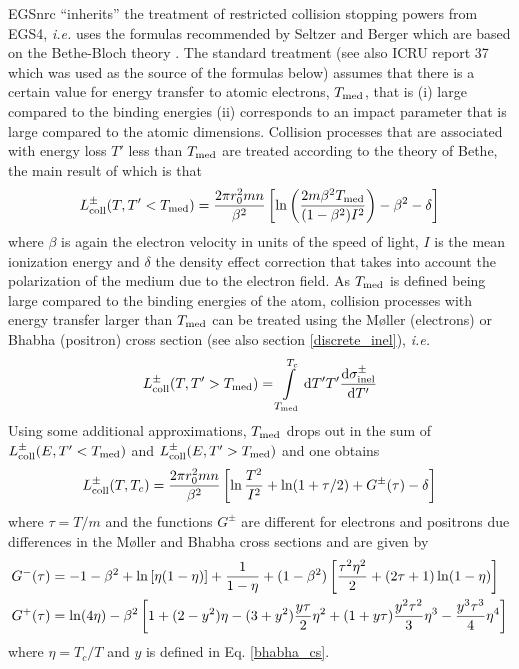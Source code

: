 EGSnrc ``inherits'' the treatment of restricted collision
stopping powers from EGS4, {\em i.e.} uses the formulas
recommended by Seltzer and Berger \cite{BS64} which are based
on the Bethe-Bloch theory \cite{Be30,Be32,Bl33}. The standard
treatment (see also ICRU report 37 \cite{ICRU37} which was
used as the source of the formulas below)
assumes that there is a certain value for energy
transfer to atomic electrons, $T_{\rm med}$, that is (i)
large compared to the binding energies (ii) corresponds to
an impact parameter that is large compared to the atomic
dimensions. Collision processes that are associated with
energy loss $T'$ less than $T_{\rm med}$ are treated according to
the theory of Bethe, the main result of which is that
\begin{equation}
L_{\rm coll}^\pm(T,T' < T_{\rm med}) = {2 \pi r_0^2 m n \over \beta^2}
\left[ \ln \left(2 m \beta^2 T_{\rm med} \over (1 - \beta^2) I^2 \right)
- \beta^2 - \delta \right]
\end{equation}
where $\beta$ is again the electron velocity in units of
the speed of light, $I$ is the mean ionization energy and
$\delta$ the density effect correction that takes into
account the polarization of the medium due to the electron field.
As $T_{\rm med}$ is defined being large compared to the binding energies of
the atom, collision processes with energy transfer larger
than $T_{\rm med}$ can be treated using the M{\o}ller \cite{Mo32a} (electrons)
or Bhabha \cite{Bh35} (positron) cross section (see also section
\ref{discrete_inel}), {\em i.e.}
 
\begin{equation}
L_{\rm coll}^\pm(T,T' > T_{\rm med}) = \int\limits_{T_{\rm med}}^{T_c}
{\rm d}T' T' {{\rm d} \sigma_{\rm inel}^\pm \over {\rm d}T'}
\end{equation}
Using some additional approximations, $T_{\rm med}$ drops out
in the sum of $L_{\rm coll}^\pm(E,T' < T_{\rm med})$ and
$L_{\rm coll}^\pm(E,T' > T_{\rm med})$ and one obtains
\begin{equation}
L_{\rm coll}^\pm(T,T_c) = {2 \pi r_0^2 m n \over \beta^2}
\left[ \ln {T^2 \over I^2} + \ln(1 + \tau/2) + G^\pm(\tau) - \delta \right]
\end{equation}
where $\tau = T/m$ and the functions $G^\pm$ are different for
electrons and positrons due differences in the M{\o}ller and
Bhabha cross sections and are given by
\begin{equation}
\begin{split}
G^-(\tau) & = -1 - \beta^2  + \ln\left[ \eta (1 - \eta) \right] +
{1 \over 1 - \eta} + (1 - \beta^2) \left[ {\tau^2 \eta^2 \over 2} +
(2 \tau + 1) \ln(1 - \eta) \right] \\
G^+(\tau) & = \ln(4 \eta) - \beta^2 \left[ 1 + (2 - y^2) \eta -
(3 + y^2) {y \tau \over 2} \eta^2 + (1 + y \tau) {y^2 \tau^2 \over 3} \eta^3
- {y^3 \tau^3 \over 4} \eta^4
\right]
\end{split}
\end{equation}
where $\eta = T_c/T$ and $y$ is defined in Eq. \eqref{bhabha_cs}.


